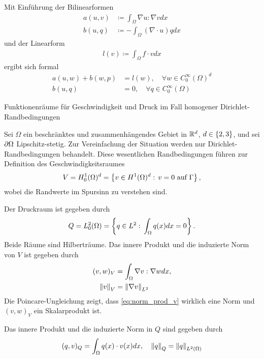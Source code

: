 Mit Einführung der Bilinearformen
\begin{align*}
  a(u, v) &\coloneqq \int_{\Omega} \nabla u : \nabla v dx\\
  b(u, q) &\coloneqq -\int_{\Omega} (\nabla \cdot u) q dx
\end{align*}
und der Linearform
\begin{align*}
  l(v) \coloneqq \int_{\Omega} f\cdot v dx
\end{align*}
ergibt sich formal
\begin{align}\label{eq:bilinearform}
  a(u, w) + b(w, p) &= l(w), \quad \forall w \in C_{0}^{\infty}(\Omega)^{d}\\
b(u, q) &= 0, \quad \forall q \in C_{0}^{\infty}(\Omega)
\end{align}
\begin{bemerkung*}
  Funktionenräume für Geschwindigkeit und Druck im Fall homogener Dirichlet-Randbedingungen

Sei $\Omega$ ein beschränktes und zusammenhängendes Gebiet in $\mathbb{R}^{d}$, $d \in \left\{ 2, 3 \right\}$, und sei $\partial \Omega$ Lipschitz-stetig. Zur Vereinfachung der Situation werden nur Dirichlet-Randbedingungen behandelt. Diese wesentlichen Randbedingungen führen zur Definition des Geschwindigkeitsraumes
\begin{align*}
  V = H_{0}^{1}(\Omega)^{d} = \left\{ v \in H^{1}(\Omega)^{d}: \, v = 0 \text{ auf } \Gamma \right\}, 
\end{align*}
wobei die Randwerte im Spursinn zu verstehen sind. 

Der Druckraum ist gegeben durch
\begin{align*}
  Q = L_{0}^{2}(\Omega) = \left\{ q \in L^{2}: \, \int_{\Omega} q(x) dx = 0 \right\}.
\end{align*}
Beide Räume sind Hilberträume. Das innere Produkt und die induzierte Norm von $V$ ist gegeben durch
\begin{align}\label{eq:norm_prod_v}
  (v, w)_{V} &= \int_{\Omega} \nabla v: \nabla w dx, \notag \\
\left \|v \right\|_{V} &= \left \|\nabla v \right\|_{L^{2}}
\end{align}
Die Poincare-Ungleichung zeigt, dass \eqref{eq:norm_prod_v} wirklich eine Norm und $(v, w)_{V}$ ein Skalarprodukt ist. 
\end{bemerkung*}
Das innere Produkt und die induzierte Norm in $Q$ sind gegeben durch
\begin{align*}
  (q, v)_{Q} = \int_{\Omega} q(x) \cdot v(x) dx, \quad \left \|q \right\|_{Q} = \left \|q \right\|_{L^{2}(\Omega)}
\end{align*}

